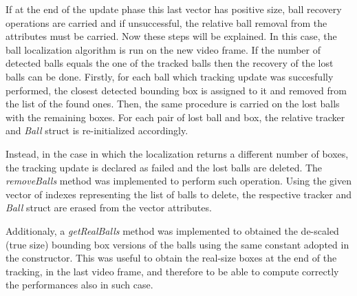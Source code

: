 If at the end of the update phase this last vector has positive size, ball recovery operations are carried and if unsuccessful, the relative ball removal from the attributes 
must be carried. Now these steps will be explained. In this case, the ball localization algorithm is run on the new video frame. If the number of detected balls equals the one
of the tracked balls then the recovery of the lost balls can be done. Firstly, for each ball which tracking update was succesfully performed, the closest detected bounding box
is assigned to it and removed from the list of the found ones. Then, the same procedure is carried on the lost balls with the remaining boxes. For each pair of lost ball and box,
the relative tracker and \textit{Ball} struct is re-initialized accordingly.

Instead, in the case in which the localization returns a different number of boxes, the tracking update is declared as failed and the lost balls are deleted. 
The \textit{removeBalls} method was implemented to perform such operation. Using the given vector of indexes representing the list of balls to delete, the respective
tracker and \textit{Ball} struct are erased from the vector attributes.

Additionaly, a \textit{getRealBalls} method was implemented to obtained the de-scaled (true size) bounding box versions of the balls using the same constant adopted in
the constructor. This was useful to obtain the real-size boxes at the end of the tracking, in the last video frame, and therefore to be able to compute correctly
the performances also in such case.
